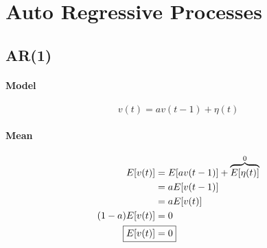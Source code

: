 \documentclass{report}
\begin{document}
\section{Auto Regressive Processes}
\subsection{AR(1)}
\paragraph{Model}
\[v(t)=av(t-1)+\eta(t)\]
\paragraph{Mean}
\begin{alignat*}{2}
E[v(t)]&=E[av(t-1)]+\overbrace{E[\eta(t)]}^0\\
&=aE[v(t-1)]\\
&=aE[v(t)]\\
(1-a)E[v(t)]&=0\\
\Aboxed{
E[v(t)]&=0
}
\end{alignat*}
\end{document}
